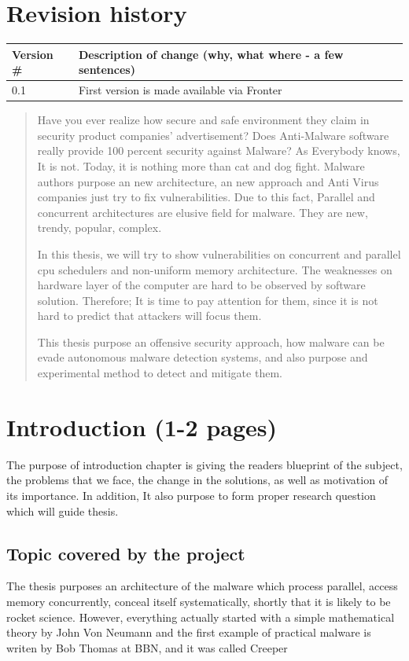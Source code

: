 \chapter*{Revision history}

\begin{center}
\begin{tabular}[H]{|l|p{35em}|}
\hline
Version \#  & Description of change (why, what where - a few sentences)\\
\hline
      0.1   & First version is made available via Fronter\\
\hline
\end{tabular}
\end{center}
\newpage

\begin{abstract}
Have you ever realize how secure and safe environment they claim in security product companies' advertisement? Does Anti-Malware software really provide 100 percent security against Malware? As Everybody knows, It is not. Today, it is nothing more than cat and dog fight. Malware authors purpose an new architecture, an new approach and Anti Virus companies just try to fix vulnerabilities. Due to this fact, Parallel and concurrent architectures are elusive field for malware. They are new, trendy, popular, complex. 

In this thesis, we will try to show vulnerabilities on concurrent and parallel cpu schedulers and non-uniform memory architecture. The weaknesses on hardware layer of the computer are hard to be observed by software solution. Therefore; It is time to pay attention for them, since it is not hard to predict that attackers will focus them.

This thesis purpose an offensive security approach, how malware can be evade autonomous malware detection systems, and also purpose and experimental method to detect and mitigate them.
\end{abstract}
\tableofcontents

\chapter{Introduction (1-2 pages)}
The purpose of introduction chapter is giving the readers blueprint of the subject, the problems that we face, the change in the solutions, as well as motivation of its importance. In addition, It also purpose to form proper research question which will guide thesis. 

\section{Topic covered by the project}
The thesis purposes an architecture of the malware which process parallel, access memory concurrently, conceal itself systematically, shortly that it is likely to be rocket science. However, everything actually started with a simple mathematical theory by John Von Neumann \cite{von1966theory} and the first example of practical malware is writen by Bob Thomas at BBN, and it was called Creeper 

